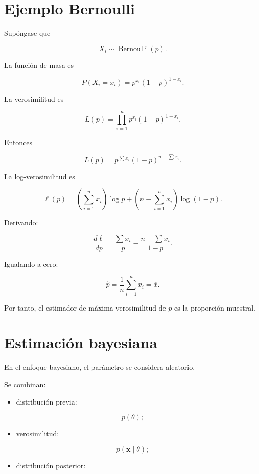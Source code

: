 \documentclass[
  spanish,
  11pt,
  letterpaper,
  DIV=11,
  numbers=noendperiod]{scrreprt}
\providecommand{\tightlist}{%
  \setlength{\itemsep}{0pt}\setlength{\parskip}{0pt}}
\theoremstyle{definition}
\theoremstyle{plain}
\theoremstyle{definition}
\theoremstyle{remark}
\begin{document}
\section{Ejemplo Bernoulli}\label{ejemplo-bernoulli}

Supóngase que

\[
X_i\sim\operatorname{Bernoulli}(p).
\]

La función de masa es

\[
P(X_i=x_i)
=
p^{x_i}(1-p)^{1-x_i}.
\]

La verosimilitud es

\[
L(p)
=
\prod_{i=1}^{n}
p^{x_i}(1-p)^{1-x_i}.
\]

Entonces

\[
L(p)
=
p^{\sum x_i}
(1-p)^{n-\sum x_i}.
\]

La log-verosimilitud es

\[
\ell(p)
=
\left(
\sum_{i=1}^{n}x_i
\right)
\log p
+
\left(
n-\sum_{i=1}^{n}x_i
\right)
\log(1-p).
\]

Derivando:

\[
\frac{d\ell}{dp}
=
\frac{\sum x_i}{p}
-
\frac{n-\sum x_i}{1-p}.
\]

Igualando a cero:

\[
\widehat{p}
=
\frac{1}{n}
\sum_{i=1}^{n}x_i
=
\overline{x}.
\]

Por tanto, el estimador de máxima verosimilitud de \(p\) es la
proporción muestral.

\section{Estimación bayesiana}\label{estimaciuxf3n-bayesiana}

En el enfoque bayesiano, el parámetro se considera aleatorio.

Se combinan:

\begin{itemize}
\tightlist
\item
  distribución previa:
\end{itemize}

\[
p(\theta);
\]

\begin{itemize}
\tightlist
\item
  verosimilitud:
\end{itemize}

\[
p(\mathbf{x}\mid\theta);
\]

\begin{itemize}
\tightlist
\item
  distribución posterior:
\end{itemize}
\end{document}
